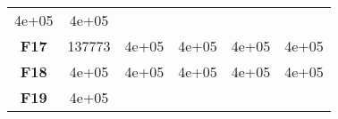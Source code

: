 \documentclass[12pt,a4paper]{article}
\begin{document}
\begin{longtable}[c]{@{}cccccc@{}}
\begin{minipage}[t]{0.10\columnwidth}
4e+05
\strut\end{minipage} &
\begin{minipage}[t]{0.10\columnwidth}\centering\strut
4e+05
\strut\end{minipage}\tabularnewline
\begin{minipage}[t]{0.12\columnwidth}\centering\strut
\textbf{F17}
\strut\end{minipage} &
\begin{minipage}[t]{0.08\columnwidth}\centering\strut
137773
\strut\end{minipage} &
\begin{minipage}[t]{0.08\columnwidth}\centering\strut
4e+05
\strut\end{minipage} &
\begin{minipage}[t]{0.09\columnwidth}\centering\strut
4e+05
\strut\end{minipage} &
\begin{minipage}[t]{0.10\columnwidth}\centering\strut
4e+05
\strut\end{minipage} &
\begin{minipage}[t]{0.10\columnwidth}\centering\strut
4e+05
\strut\end{minipage}\tabularnewline
\begin{minipage}[t]{0.12\columnwidth}\centering\strut
\textbf{F18}
\strut\end{minipage} &
\begin{minipage}[t]{0.08\columnwidth}\centering\strut
4e+05
\strut\end{minipage} &
\begin{minipage}[t]{0.08\columnwidth}\centering\strut
4e+05
\strut\end{minipage} &
\begin{minipage}[t]{0.09\columnwidth}\centering\strut
4e+05
\strut\end{minipage} &
\begin{minipage}[t]{0.10\columnwidth}\centering\strut
4e+05
\strut\end{minipage} &
\begin{minipage}[t]{0.10\columnwidth}\centering\strut
4e+05
\strut\end{minipage}\tabularnewline
\begin{minipage}[t]{0.12\columnwidth}\centering\strut
\textbf{F19}
\strut\end{minipage} &
\begin{minipage}[t]{0.08\columnwidth}\centering\strut
4e+05
\strut\end{minipage} &
\begin{minipage}[t]{0.08\columnwidth}\centering\strut

\end{minipage}
\end{longtable}
\end{document}
